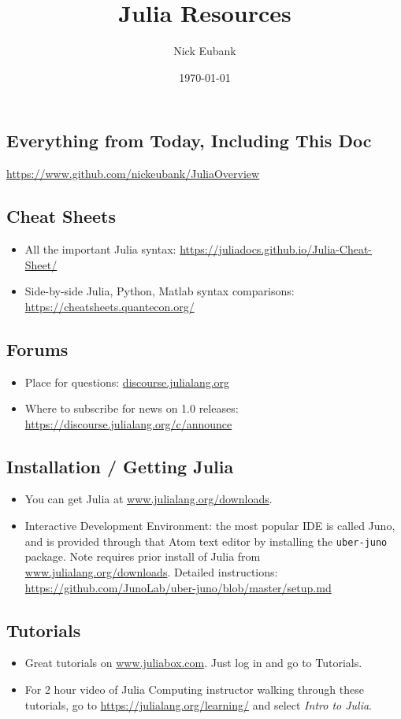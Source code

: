\documentclass[12pt]{article}
\title{Julia Resources}
\author{Nick Eubank}
\date{\today}
\begin{document}
\maketitle

\subsection*{Everything from Today, Including This Doc}
\url{https://www.github.com/nickeubank/JuliaOverview}


\subsection*{Cheat Sheets}
\begin{itemize}
    \item All the important Julia syntax: \url{https://juliadocs.github.io/Julia-Cheat-Sheet/}
    \item Side-by-side Julia, Python, Matlab syntax comparisons: \url{https://cheatsheets.quantecon.org/}
\end{itemize}

\subsection*{Forums}
\begin{itemize}
    \item Place for questions: \url{discourse.julialang.org}
    \item Where to subscribe for news on 1.0 releases: \url{https://discourse.julialang.org/c/announce}
\end{itemize}


\subsection*{Installation / Getting Julia}
\begin{itemize}
    \item You can get Julia at \url{www.julialang.org/downloads}.
    \item Interactive Development Environment: the most popular IDE is called Juno, and is provided through that Atom text editor by installing the \texttt{uber-juno} package. Note requires prior install of Julia from \url{www.julialang.org/downloads}. Detailed instructions: \url{https://github.com/JunoLab/uber-juno/blob/master/setup.md}
\end{itemize}

\subsection*{Tutorials}
\begin{itemize}
    \item Great tutorials on \url{www.juliabox.com}. Just log in and go to Tutorials.
    \item For 2 hour video of Julia Computing instructor walking through these tutorials, go to \url{https://julialang.org/learning/} and select \emph{Intro to Julia}.
\end{itemize}
\end{document}
